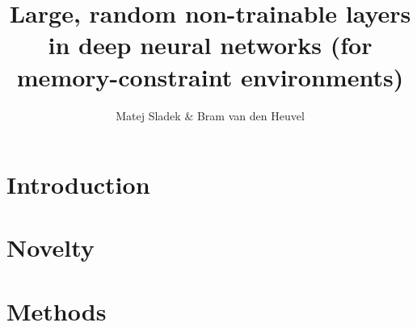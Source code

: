 \documentclass[]{article}
\title{Large, random non-trainable layers in deep neural networks (for memory-constraint environments)}
\author{Matej Sladek \& Bram van den Heuvel}
\begin{document}
\maketitle

\section{Introduction}
\blindtext

\section{Novelty}
\blindtext

\section{Methods}
\blindtext
\end{document}
